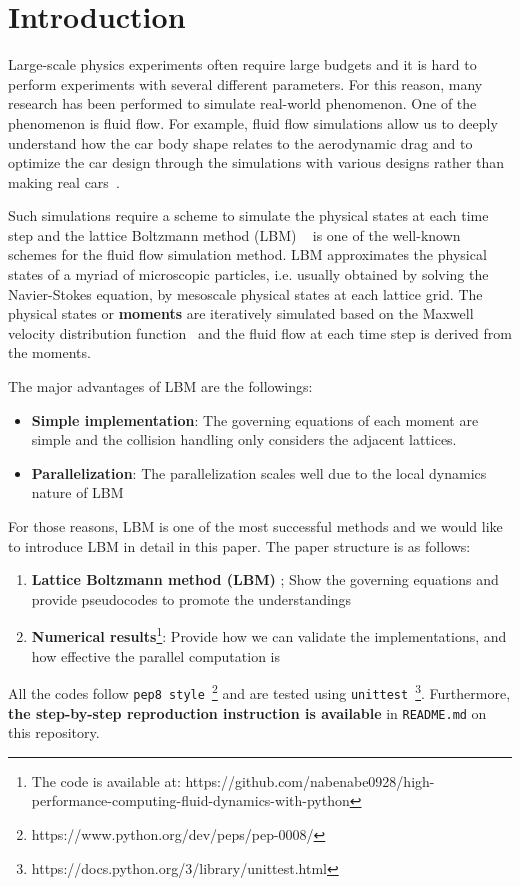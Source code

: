 \chapter{Introduction}
\vspace{-8mm}
Large-scale physics experiments often require large budgets
and it is hard to perform experiments with several different parameters.
For this reason, many research has been performed to simulate real-world 
phenomenon.
One of the phenomenon is fluid flow.
For example, fluid flow simulations allow us to deeply understand
how the car body shape relates to the aerodynamic drag
and to optimize the car design through the simulations with
various designs rather than making real cars~\cite{padagannavar2016automotive}.

Such simulations require a scheme to simulate the physical states
at each time step
and the lattice Boltzmann method (LBM) ~\cite{timm2016lattice}
is one of the well-known
schemes for the fluid flow simulation method.
LBM approximates the physical states of a myriad of microscopic particles,
i.e. usually obtained by solving the Navier-Stokes equation,
by mesoscale physical states at each lattice grid.
The physical states or {\bf moments} are iteratively simulated based on
the Maxwell velocity distribution function~\cite{huang1963statistical} and
the fluid flow at each time step is derived from the moments.

The major advantages of LBM are the followings:
\begin{itemize}
  \item {\bf Simple implementation}: The governing equations of each moment
  are simple and the collision handling only considers the adjacent lattices. 
  \item {\bf Parallelization}: The parallelization scales well due to
  the local dynamics nature of LBM~\cite{raabe2004overview}
\end{itemize}
For those reasons, LBM is one of the most successful methods and
we would like to introduce LBM in detail in this paper.
The paper structure is as follows:
\begin{enumerate}
  \item {\bf Lattice Boltzmann method (LBM) }; Show the governing equations and 
  provide pseudocodes to promote the understandings
  \item {\bf Numerical results}\footnote{
  The code is available at:
    https://github.com/nabenabe0928/high-performance-computing-fluid-dynamics-with-python
  }: Provide how we can validate the implementations,
  and how effective the parallel computation is
\end{enumerate}
All the codes follow {\tt pep8 style}~\footnote{https://www.python.org/dev/peps/pep-0008/} and 
are tested using
{\tt unittest}~\footnote{https://docs.python.org/3/library/unittest.html}.
Furthermore, {\bf the step-by-step reproduction instruction is available}
in {\tt README.md} on this repository.
